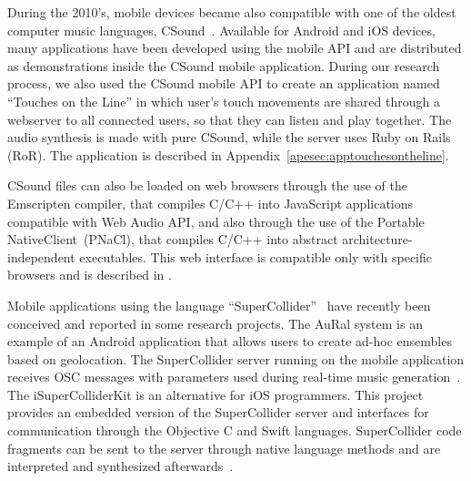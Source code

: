 During the 2010's, mobile devices became also compatible with one of the oldest computer music languages, CSound~\citep{Vercoe1990csound}.
Available for Android and iOS devices, many applications have been developed using the mobile API and are distributed as demonstrations inside the CSound mobile application.
During our research process, we also used the CSound mobile API to create an application named ``Touches on the Line'' in which user's touch movements are shared through a webserver to all connected users, so that they can listen and play together.
The audio synthesis is made with pure CSound, while the server uses Ruby on Rails (RoR).
The application is described in Appendix~\ref{apesec:apptouchesontheline}.

CSound files can also be loaded on web browsers through the use of the Emscripten compiler, that compiles C/C++ into JavaScript applications compatible with Web Audio API, and also through the use of the Portable NativeClient~(PNaCl), that compiles C/C++ into abstract architecture-independent executables.
This web interface is compatible only with specific browsers and is described in \cite{Lazzarini2014csound}.

Mobile applications using the language ``SuperCollider''~\citep{Mccartney2002supercollider} have recently been conceived and reported in some research projects.
The AuRal system is an example of an Android application that allows users to create ad-hoc ensembles based on geolocation.
The SuperCollider server running on the mobile application receives OSC messages with parameters used during real-time music generation~\citep{Allison2012aural}.
The iSuperColliderKit is an alternative for iOS programmers.
This project provides an embedded version of the SuperCollider server and interfaces for communication through the Objective C and Swift languages.
SuperCollider code fragments can be sent to the server through native language methods and are interpreted and synthesized afterwards~\citep{Ito2015isupercolliderkit}.

